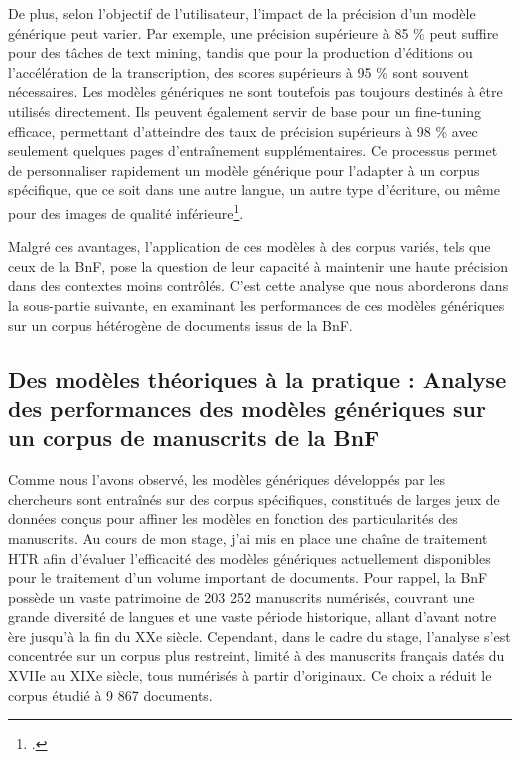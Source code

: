 \documentclass[a4paper,12pt,twoside]{book}
\begin{document}
	De plus, selon l’objectif de l’utilisateur, l’impact de la précision d’un modèle générique peut varier. Par exemple, une précision supérieure à 85 \% peut suffire pour des tâches de text mining, tandis que pour la production d’éditions ou l’accélération de la transcription, des scores supérieurs à 95 \% sont souvent nécessaires. Les modèles génériques ne sont toutefois pas toujours destinés à être utilisés directement. Ils peuvent également servir de base pour un fine-tuning efficace, permettant d’atteindre des taux de précision supérieurs à 98 \% avec seulement quelques pages d’entraînement supplémentaires. Ce processus permet de personnaliser rapidement un modèle générique pour l’adapter à un corpus spécifique, que ce soit dans une autre langue, un autre type d’écriture, ou même pour des images de qualité inférieure\footcite{pinche_generic_2023}.
	
	Malgré ces avantages, l’application de ces modèles à des corpus variés, tels que ceux de la BnF, pose la question de leur capacité à maintenir une haute précision dans des contextes moins contrôlés. C’est cette analyse que nous aborderons dans la sous-partie suivante, en examinant les performances de ces modèles génériques sur un corpus hétérogène de documents issus de la BnF.
	\\
	
	\subsection{Des modèles théoriques à la pratique : Analyse des performances des modèles génériques sur un corpus de manuscrits de la BnF}
	
	Comme nous l’avons observé, les modèles génériques développés par les chercheurs sont entraînés sur des corpus spécifiques, constitués de larges jeux de données conçus pour affiner les modèles en fonction des particularités des manuscrits. Au cours de mon stage, j’ai mis en place une chaîne de traitement HTR afin d’évaluer l’efficacité des modèles génériques actuellement disponibles pour le traitement d’un volume important de documents. Pour rappel, la BnF possède un vaste patrimoine de 203 252 manuscrits numérisés, couvrant une grande diversité de langues et une vaste période historique, allant d’avant notre ère jusqu’à la fin du XXe siècle. Cependant, dans le cadre du stage, l’analyse s’est concentrée sur un corpus plus restreint, limité à des manuscrits français datés du XVIIe au XIXe siècle, tous numérisés à partir d’originaux. Ce choix a réduit le corpus étudié à 9 867 documents.
	\\
	
\end{document}
